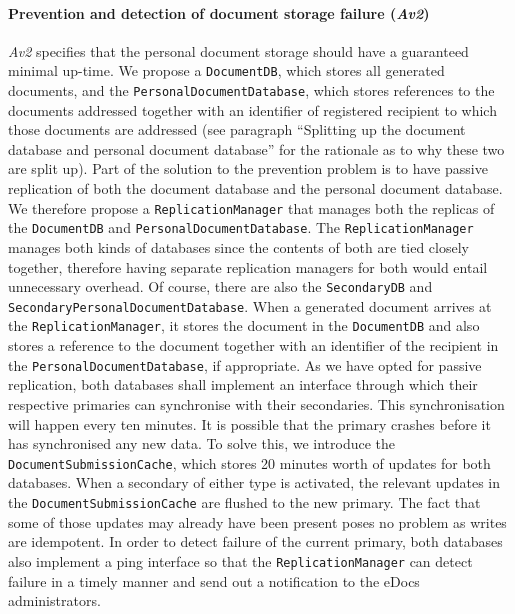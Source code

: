 \documentclass[a4paper,10pt]{article}
\begin{document}
\paragraph{Prevention and detection of document storage failure (\emph{Av2})}
\emph{Av2} specifies that the personal document storage should have a guaranteed minimal up-time. We propose a \texttt{DocumentDB}, which stores all generated documents, and the \texttt{PersonalDocumentDatabase}, which stores references to the documents addressed together with an identifier of registered recipient to which those documents are addressed (see paragraph ``Splitting up the document database and personal document database'' for the rationale as to why these two are split up). Part of the solution to the prevention problem is to have passive replication of both the document database and the personal document database. We therefore propose a \texttt{ReplicationManager} that manages both the replicas of the \texttt{DocumentDB} and \texttt{PersonalDocumentDatabase}. The \texttt{ReplicationManager} manages both kinds of databases since the contents of both are tied closely together, therefore having separate replication managers for both would entail unnecessary overhead. Of course, there are also the \texttt{SecondaryDB} and \texttt{SecondaryPersonalDocumentDatabase}. When a generated document arrives at the \texttt{ReplicationManager}, it stores the document in the \texttt{DocumentDB} and also stores a reference to the document together with an identifier of the recipient in the \texttt{PersonalDocumentDatabase}, if appropriate. As we have opted for passive replication, both databases shall implement an interface through which their respective primaries can synchronise with their secondaries. This synchronisation will happen every ten minutes. It is possible that the primary crashes before it has synchronised any new data. To solve this, we introduce the \texttt{DocumentSubmissionCache}, which stores 20 minutes worth of updates for both databases. When a secondary of either type is activated, the relevant updates in the \texttt{DocumentSubmissionCache} are flushed to the new primary. The fact that some of those updates may already have been present poses no problem as writes are idempotent. In order to detect failure of the current primary, both databases also implement a ping interface so that the \texttt{ReplicationManager} can detect failure in a timely manner and send out a notification to the eDocs administrators.
\end{document}
